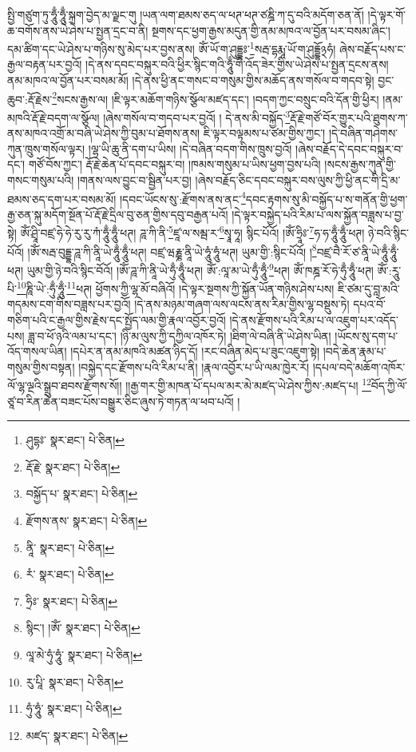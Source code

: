 སྤྱི་གཙུག་ཏུ་ཧཱུྃ་ཧཱུྃ་སྐྲག་བྱེད་མ་ལྗང་གུ །ཡན་ལག་ཐམས་ཅད་ལ་ཕཊ་ཕཊ་ཙཎྜི་ཀ་དུ་བའི་མདོག་ཅན་ནོ། །དེ་ལྟར་གོ་ཆ་བགོས་ནས་ཡེ་ཤེས་པ་སྤྱན་དྲང་བ་ནི། སྔགས་དང་ཕྱག་རྒྱས་མདུན་གྱི་ནམ་མཁའ་ལ་བྱོན་པར་བསམ་ཞིང་། དམ་ཚིག་དང་ཡེ་ཤེས་པ་གཉིས་སུ་མེད་པར་བྱས་ནས། ཨོཾ་ཡོ་ག་ཤུདྡྷཿ་\footnote{ཤུདྷཿ་  སྣར་ཐང་།  པེ་ཅིན། }སརྦ་དྷརྨཱ་ཡོ་ག་ཤུདྡྷོ྅ཧཾ། ཞེས་བརྗོད་པས་ང་རྒྱལ་བརྟན་པར་བྱའོ། །དེ་ནས་དབང་བསྐུར་བའི་ཕྱིར་སྙིང་གའི་ཧཱུྃ་གི་འོད་ཟེར་གྱིས་ཡེ་ཤེས་པ་སྤྱན་དྲངས་ནས། ནམ་མཁའ་ལ་བྱོན་པར་བསམ་མོ། །དེ་ནས་ཕྱི་ནང་གསང་བ་གསུམ་གྱིས་མཆོད་ནས་གསོལ་བ་གདབ་སྟེ། བྱང་ཆུབ་:རྡོ་རྗེས་\footnote{རྡོ་རྗེ་  སྣར་ཐང་།  པེ་ཅིན། }སངས་རྒྱས་ལ། །ཇི་ལྟར་མཆོག་གཉིས་སྩོལ་མཛད་དང་། །བདག་ཀྱང་བསྲུང་བའི་དོན་གྱི་ཕྱིར། །ནམ་མཁའི་རྡོ་རྗེ་བདག་ལ་སྩོལ། །ཞེས་གསོལ་བ་གདབ་པར་བྱའོ། །
དེ་ནས་མི་བསྐྱོད་\footnote{བསྐྱོད་པ་  སྣར་ཐང་།  པེ་ཅིན། }རྡོ་རྗེ་གཙོ་བོར་གྱུར་པའི་ཐུགས་ཀ་ནས་མཁའ་འགྲོ་མ་བཞི་ཡེ་ཤེས་ཀྱི་བུམ་པ་ཐོགས་ནས། ཇི་ལྟར་བལྟམས་པ་ཙམ་གྱིས་ཀྱང་། །དེ་བཞིན་གཤེགས་ཀུན་ཁྲུས་གསོལ་ལྟར། །ལྷ་ཡི་ཆུ་ནི་དག་པ་ཡིས། །དེ་བཞིན་བདག་གིས་ཁྲུས་བྱའོ། །ཞེས་བརྗོད་དེ་དབང་བསྐུར་བ་དང་། གཙོ་བོས་ཀྱང་། རྡོ་རྗེ་ཆེན་པོ་དབང་བསྐུར་བ། །ཁམས་གསུམ་པ་ཡིས་ཕྱག་བྱས་པའི། །སངས་རྒྱས་ཀུན་གྱི་གསང་གསུམ་པའི། །གནས་ལས་བྱུང་བ་སྦྱིན་པར་བྱ། །ཞེས་བརྗོད་ཅིང་དབང་བསྐུར་བས་ལུས་ཀྱི་ཕྱི་ནང་གི་དྲི་མ་ཐམས་ཅད་དག་པར་བསམ་མོ། །དབང་ཡོངས་སུ་:རྫོགས་ནས་ནང་\footnote{རྫོགས་ནས་  སྣར་ཐང་།  པེ་ཅིན། }དབང་རྟགས་སུ་མི་བསྐྱོད་པ་ས་གནོན་གྱི་ཕྱག་རྒྱ་ཅན་སྐུ་མདོག་སྔོན་པོ་རྡོ་རྗེ་དྲིལ་བུ་ཅན་གྱིས་དབུ་བརྒྱན་པའོ། །དེ་ལྟར་བསྐྱེད་པའི་རིམ་པ་ལས་སྐྱོན་བཟླས་པ་བྱ་སྟེ། ཨོཾ་ཤྲཱི་བཛྲ་ཧེ་ཧེ་རུ་རུ་ཀཾ་ཧཱུྃ་ཧཱུྃ་ཕཊ། ཌཱ་ཀི་ནི་\footnote{ནཱི་  སྣར་ཐང་།  པེ་ཅིན། }ཛཱ་ལ་སམྦ་ར་\footnote{རཾ་  སྣར་ཐང་།  པེ་ཅིན། }སྭཱ་ཧཱ། སྙིང་པོའོ། །ཨོཾ་ཧྲཱིཿ་\footnote{ཧྲིཿ་  སྣར་ཐང་།  པེ་ཅིན། }ཧ་ཧ་ཧཱུྃ་ཧཱུྃ་ཕཊ། ཉེ་བའི་སྙིང་པོའོ། །ཨོཾ་སརྦ་བུདྡྷ་ཌཱ་ཀི་ནཱི་ཡེ་ཧཱུྃ་ཧཱུྃ་ཕཊ། བཛྲ་ཝརྞྞ་ནཱི་ཡེ་ཧཱུཾ་ཧཱུཾ་ཕཊ། ཡུམ་གྱི་:སྙིང་པོའོ། །\footnote{སྙིང་། །ཨོཾ་  སྣར་ཐང་།  པེ་ཅིན། }བཛྲ་བཻ་རོ་ཙ་ནཱི་ཡེ་ཧཱུྃ་ཧཱུྃ་ཕཊ། ཡུམ་གྱི་ཉེ་བའི་སྙིང་བོའོ། །ཨོཾ་ཌཱ་ཀི་ནཱི་ཡེ་ཧུྃ་ཧཱུྃ་ཕཊ། ཨོཾ་:ལཱ་མ་ཡེ་ཧུྃ་ཧཱུྃ་\footnote{ལཱ་མེ་ཧུཾ་ཧཱུཾ་  སྣར་ཐང་།  པེ་ཅིན། }ཕཊ། ཨོཾ་ཁཎྜ་རོ་ཧེ་ཧུྃ་ཧཱུྃ་ཕཊ། ཨོཾ་:རཱུ་པི་\footnote{རུ་པཱི་  སྣར་ཐང་།  པེ་ཅིན། }ཎཱི་ཡེ་:ཧུྃ་ཧཱུྃ་\footnote{ཧུཾ་ཧཱུཾ་  སྣར་ཐང་།  པེ་ཅིན། }ཕཊ། ཕྱོགས་ཀྱི་ལྷ་མོ་བཞིའོ། །དེ་ལྟར་སྔགས་ཀྱི་སྐྱོན་ཡོན་གཉིས་ཤེས་པས། ཇི་ཙམ་དུ་བླ་མའི་གདམས་ངག་གིས་བཟླས་པར་བྱའོ། །དེ་ནས་མཉམ་གཞག་ལས་ལངས་ནས་རིམ་གྱིས་ལྷ་བསྡུས་ཏེ། དཔའ་བོ་གཅིག་པའི་ང་རྒྱལ་གྱིས་རྗེས་དང་སྤྱོད་ལམ་གྱི་རྣལ་འབྱོར་བྱའོ། །དེ་ནས་རྫོགས་པའི་རིམ་པ་ལ་འཇུག་པར་འདོད་པས། ཟླ་བ་ཕོ་ཉའི་ལམ་པ་དང་། །ཉི་མ་ལུས་ཀྱི་དཀྱིལ་འཁོར་ཏེ། །ཐིག་ལེ་བཞི་ནི་ཡེ་ཤེས་ཡིན། །ཡོངས་སུ་དག་པ་འོད་གསལ་ཡིན། །དཔེར་ན་ནམ་མཁའི་མཚན་ཉིད་དོ། །རང་བཞིན་མེད་པ་ཟུང་འཇུག་སྟེ། །བདེ་ཆེན་རྣམ་པ་གསུམ་གྱིས་བསྟན། །བསྐྱེད་དང་རྫོགས་པའི་རིམ་པ་ནི། །རྣལ་འབྱོར་པ་ཡི་ལམ་ཁྱེར་རོ། །དཔལ་བདེ་མཆོག་འཁོར་ལོ་ལྷ་ལྔའི་སྒྲུབ་ཐབས་རྫོགས་སོ།། །།རྒྱ་གར་གྱི་མཁན་པོ་དཔལ་མར་མེ་མཛད་ཡེ་ཤེས་ཀྱིས་:མཛད་པ། \footnote{མཛད་  སྣར་ཐང་།  པེ་ཅིན། }བོད་ཀྱི་ལོ་ཙཱ་བ་རིན་ཆེན་བཟང་པོས་བསྒྱུར་ཅིང་ཞུས་ཏེ་གཏན་ལ་ཕབ་པའོ། ། 